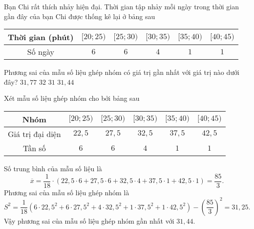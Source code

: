 \begin{ex}%
	Bạn Chi rất thích nhảy hiện đại. Thời gian tập nhảy mỗi ngày trong thời gian gần đây của bạn Chi được thống kê lại ở bảng sau
	\begin{center}
		\begin{tabular}{|c|c|c|c|c|c|}
			\hline
			Thời gian (phút) & $[20;25)$ & $[25;30)$ & $[30;35)$ & $[35;40)$ & $[40;45)$ \\
			\hline
			Số ngày          & $6$       & $6$       & $4$       & $1$       & $1$       \\
			\hline
		\end{tabular}
	\end{center}
	Phương sai của mẫu số liệu ghép nhóm có giá trị gần nhất với giá trị nào dưới đây?
	\choice
	{$31{,}77$}
	{$32$}
	{$31$}
	{\True $31{,}44$}
	\loigiai
	{
	Xét mẫu số liệu ghép nhóm cho bởi bảng sau
	\begin{center}
		\begin{tabular}{|c|c|c|c|c|c|}
			\hline
			Nhóm             & $[20;25)$ & $[25;30)$ & $[30;35)$ & $[35;40)$ & $[40;45)$ \\
			\hline
			Giá trị đại diện & $22{,}5$  & $27{,}5$  & $32{,}5$  & $37{,}5$  & $42{,}5$  \\
			\hline
			Tần số           & $6$       & $6$       & $4$       & $1$       & $1$       \\
			\hline
		\end{tabular}
	\end{center}
	Số trung bình của mẫu số liệu là
	$$\overline{x}=\dfrac{1}{18}\cdot (22{,}5\cdot 6+27{,}5\cdot 6+32{,}5\cdot 4+37{,}5\cdot 1+42{,}5\cdot 1)=\dfrac{85}{3}.$$
	Phương sai của mẫu số liệu ghép nhóm là
	$$S^2=\dfrac{1}{18}\left(6\cdot 22{,}5^2+6\cdot 27{,}5^2+4\cdot 32{,}5^2+1\cdot 37{,}5^2+1\cdot 42{,}5^2\right)-\left(\dfrac{85}{3}\right)^2=31{,}25.$$
	Vậy phương sai của mẫu số liệu ghép nhóm gần nhất với $31{,}44$.
	}
\end{ex}


